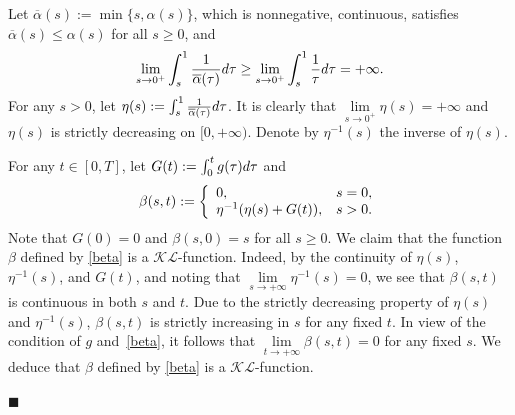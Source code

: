 \documentclass[10pt,a4paper]{amsart}
\newenvironment{proof}{{\it Proof:\enspace}}{\hfill $\blacksquare$\par}
\begin{document}
\begin{proof}
	Let $
	\overline{\alpha}(s):=\min\{s,\alpha(s)\}%
	$, which is nonnegative, continuous,  satisfies $\overline{\alpha}(s)\leq \alpha(s)$ for all $s\geq 0$, and
	\begin{align*}
		\lim\limits_{s\rightarrow 0^+}\int_{s}^1\frac{1}{\overline{\alpha}(\tau)}{\rm d}\tau\geq \lim\limits_{s\rightarrow 0^+}\int_{s}^1\frac{1}{ \tau }{\rm d}\tau=+\infty.
	\end{align*}
	For any $s>0$, let $\eta(s):=\int_{s}^1\frac{1}{\overline{\alpha} (\tau)}{\rm d}\tau$. It is clearly that $\lim\limits_{s\rightarrow 0^+}\eta(s)=+\infty$  and $\eta(s)$ is strictly decreasing on $[0,+\infty)$. Denote by $\eta^{-1}(s)$ the inverse of $\eta(s)$.
	
	For any $t\in [0,T]$, let $G(t):= \int_{0}^tg (\tau){\rm d}\tau$ and  \begin{equation}\label{beta}
		\beta(s,t):=\left\{
		\begin{array}{ll}
			0,& s=0,\\
			\eta^{-1}(\eta(s)+G(t)),&s>0.
		\end{array}\\
		\right.
	\end{equation}
	Note that $G(0)=0$ and  $ \beta (s,0)=s$ for all $s\geq0$. We claim that the function $  \beta$ defined by \eqref{beta} is a $\mathcal{K}\mathcal{L}$-function. Indeed, by the continuity of $\eta(s)$, $\eta^{-1}(s)$, and $G(t)$, and noting that $ \lim\limits_{s\rightarrow +\infty}\eta^{-1}(s)=0$,  we see that $  \beta(s,t)$  is continuous in both $s$ and $t$. Due to the strictly decreasing property of $\eta(s)$ and  $\eta^{-1}(s)$, $  \beta(s,t)$ is strictly increasing in $s$ for any fixed $t$. In view of the condition of $g$ and~\eqref{beta}, it follows that $\lim\limits_{t\rightarrow +\infty}\beta(s,t)=0$ for any fixed $s$.  We deduce that $  \beta$ defined by \eqref{beta} is a $\mathcal{K}\mathcal{L}$-function.
	

\end{proof}
\end{document}
